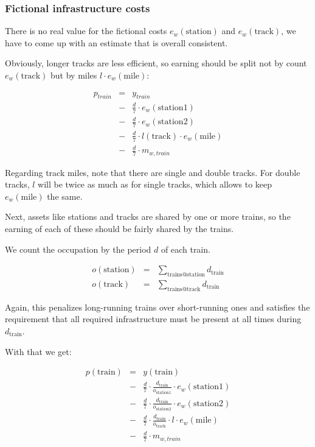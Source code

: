 \documentclass[12pt]{article}
\begin{document}
\subsubsection{Fictional infrastructure costs}

There is no real value for the fictional costs $e_w\left(\mathrm{station}\right)$ and $e_w\left(\mathrm{track}\right)$,
we have to come up with an estimate that is overall consistent.

Obviously, longer tracks are less efficient, so earning should be split not by count $e_w\left(\mathrm{track}\right)$
but by miles $l \cdot e_w\left(\mathrm{mile}\right)$:

\begin{eqnarray}
  p_\mathit{train}
    &=& y_\mathit{train} \nonumber \\
    &-& \frac{d}{7} \cdot e_w\left(\mathrm{station1}\right) \nonumber \\
    &-& \frac{d}{7} \cdot e_w\left(\mathrm{station2}\right) \nonumber \\
    &-& \frac{d}{7} \cdot l\left(\mathrm{track}\right) \cdot e_w\left(\mathrm{mile}\right) \nonumber \\
    &-& \frac{d}{7} \cdot m_{w,\mathit{train}}
\end{eqnarray}

Regarding track miles, note that there are single and double tracks. For double tracks, $l$ will
be twice as much as for single tracks, which allows to keep $e_w\left(\mathrm{mile}\right)$ the same.

Next, assets like stations and tracks are shared by one or more trains, so the earning of each of these
should be fairly shared by the trains.

We count the occupation by the period $d$ of each train.

\begin{eqnarray}
  o\left(\mathrm{station}\right) &=& \sum_{\mathrm{trains@station}} d_{\mathrm{train}} \\
  o\left(\mathrm{track}\right)   &=& \sum_{\mathrm{trains@track}} d_{\mathrm{train}}
\end{eqnarray}

Again, this penalizes long-running trains over short-running ones and satisfies the requirement that
all required infrastructure must be present at all times during $d_{\mathrm{train}}$.

With that we get:

\begin{eqnarray}
  p\left(\mathrm{train}\right)
    &=& y\left(\mathrm{train}\right) \nonumber \\
    &-& \frac{d}{7} \cdot \frac{d_\mathrm{train}}{o_\mathrm{station1}} \cdot e_w\left(\mathrm{station1}\right) \nonumber \\
    &-& \frac{d}{7} \cdot \frac{d_\mathrm{train}}{o_\mathrm{station2}} \cdot e_w\left(\mathrm{station2}\right) \nonumber \\
    &-& \frac{d}{7} \cdot \frac{d_\mathrm{train}}{o_\mathrm{track}} \cdot l \cdot e_w\left(\mathrm{mile}\right) \nonumber \\
    &-& \frac{d}{7} \cdot m_{w,\mathit{train}}
\end{eqnarray}
\end{document}
